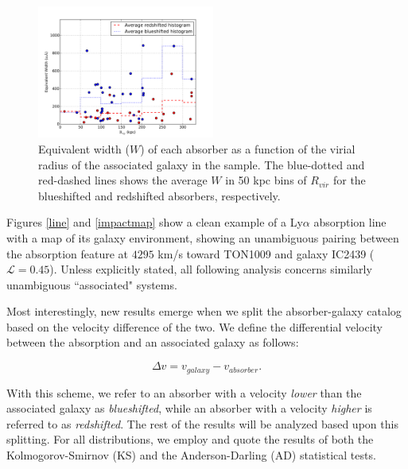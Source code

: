 \documentclass[iop]{emulateapj-rtx4}
\begin{document}
\begin{figure}[h!]
        \centering
        \includegraphics[width=0.52\textwidth]{W(vir)_avgHistograms.pdf}
        \caption{\small{Equivalent width ($W$) of each absorber as a function of the virial radius of the associated galaxy in the sample. The blue-dotted and red-dashed lines shows the average $W$ in 50 kpc bins of $R_{vir}$ for the blueshifted and redshifted absorbers, respectively.}}
        \label{w_vir}
        \vspace{2pt}
\end{figure} 


Figures \ref{line} and \ref{impactmap} show a clean example of a Ly$\alpha$ absorption line with a map of its galaxy environment, showing an unambiguous pairing between the absorption feature at $4295$ km/s toward TON1009 and galaxy IC2439 ($\mathcal{L} = 0.45$). Unless explicitly stated, all following analysis concerns similarly unambiguous ``associated" systems.


Most interestingly, new results emerge when we split the absorber-galaxy catalog based on the velocity difference of the two. We define the differential velocity between the absorption and an associated galaxy as follows:

\begin{equation}
	\Delta v = v_{galaxy} - v_{absorber}.
\end{equation}

With this scheme, we refer to an absorber with a velocity \textit{lower} than the associated galaxy as \textit{blueshifted}, while an absorber with a velocity \textit{higher} is referred to as \textit{redshifted}. The rest of the results will be analyzed based upon this splitting. For all distributions, we employ and quote the results of both the Kolmogorov-Smirnov (KS) and the Anderson-Darling (AD) statistical tests.
\end{document}
